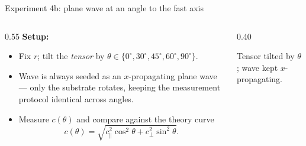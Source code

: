 \documentclass[aspectratio=169,11pt]{beamer}
\begin{document}
\begin{frame}{Experiment 4b: plane wave at an angle to the fast axis}

\begin{columns}
\begin{column}{0.55\textwidth}
\textbf{Setup:}
\begin{itemize}
    \item Fix $r$; tilt the \emph{tensor} by $\theta \in \{0^\circ, 30^\circ, 45^\circ, 60^\circ, 90^\circ\}$.
    \item Wave is always seeded as an $x$-propagating plane wave --- only the substrate rotates, keeping the measurement protocol identical across angles.
    \item Measure $c(\theta)$ and compare against the theory curve
    \[
        c(\theta) = \sqrt{c_\parallel^2 \cos^2\theta + c_\perp^2 \sin^2\theta}.
    \]
\end{itemize}
\end{column}

\begin{column}{0.40\textwidth}
\centering
{}

\vspace{0.1cm}
{\footnotesize Tensor tilted by $\theta$; wave kept $x$-propagating.}
\end{column}
\end{columns}

\end{frame}
\end{document}
